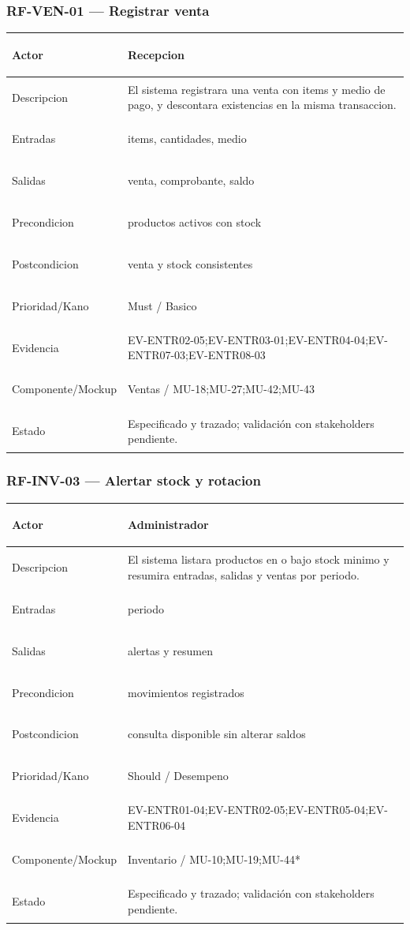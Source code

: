 \documentclass[11pt,a4paper,twoside]{article}
\begin{document}
\subsubsection{RF-VEN-01 — Registrar venta}
\begingroup
\renewcommand{\arraystretch}{1.12}
\setlength{\tabcolsep}{5pt}
\begin{tabularx}{\textwidth}{|>{\bfseries\raggedright\arraybackslash}p{3.35cm}|>{\raggedright\arraybackslash}X|}
\hline
Actor & Recepcion \\ \hline
Descripcion & El sistema registrara una venta con items y medio de pago, y descontara existencias en la misma transaccion. \\ \hline
Entradas & items, cantidades, medio \\ \hline
Salidas & venta, comprobante, saldo \\ \hline
Precondicion & productos activos con stock \\ \hline
Postcondicion & venta y stock consistentes \\ \hline
Prioridad/Kano & Must / Basico \\ \hline
Evidencia & EV-ENTR02-05;EV-ENTR03-01;EV-ENTR04-04;EV-ENTR07-03;EV-ENTR08-03 \\ \hline
Componente/Mockup & Ventas / MU-18;MU-27;MU-42;MU-43 \\ \hline
Estado & Especificado y trazado; validación con stakeholders pendiente. \\ \hline
\end{tabularx}
\endgroup

\subsubsection{RF-INV-03 — Alertar stock y rotacion}
\begingroup
\renewcommand{\arraystretch}{1.12}
\setlength{\tabcolsep}{5pt}
\begin{tabularx}{\textwidth}{|>{\bfseries\raggedright\arraybackslash}p{3.35cm}|>{\raggedright\arraybackslash}X|}
\hline
Actor & Administrador \\ \hline
Descripcion & El sistema listara productos en o bajo stock minimo y resumira entradas, salidas y ventas por periodo. \\ \hline
Entradas & periodo \\ \hline
Salidas & alertas y resumen \\ \hline
Precondicion & movimientos registrados \\ \hline
Postcondicion & consulta disponible sin alterar saldos \\ \hline
Prioridad/Kano & Should / Desempeno \\ \hline
Evidencia & EV-ENTR01-04;EV-ENTR02-05;EV-ENTR05-04;EV-ENTR06-04 \\ \hline
Componente/Mockup & Inventario / MU-10;MU-19;MU-44* \\ \hline
Estado & Especificado y trazado; validación con stakeholders pendiente. \\ \hline
\end{tabularx}
\endgroup
\end{document}
